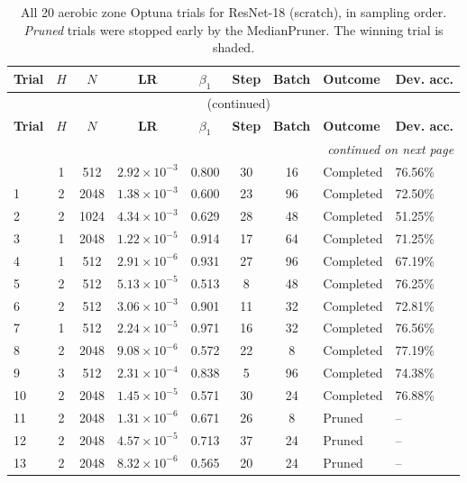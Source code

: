 {\footnotesize
\begin{longtable}{lccccccll}
\caption{All 20 aerobic zone Optuna trials for ResNet-18 (scratch), in sampling order. \emph{Pruned} trials were stopped early by the MedianPruner. The winning trial is shaded.}
\label{tab:trials_aerobic_resnet18_scratch} \\
\toprule
\textbf{Trial} & \textbf{$H$} & \textbf{$N$} & \textbf{LR} & \textbf{$\beta_1$} & \textbf{Step} & \textbf{Batch} & \textbf{Outcome} & \textbf{Dev. acc.} \\
\midrule
\endfirsthead
\multicolumn{9}{c}{\tablename\ \thetable{} (continued)} \\
\toprule
\textbf{Trial} & \textbf{$H$} & \textbf{$N$} & \textbf{LR} & \textbf{$\beta_1$} & \textbf{Step} & \textbf{Batch} & \textbf{Outcome} & \textbf{Dev. acc.} \\
\midrule
\endhead
\midrule
\multicolumn{9}{r}{\emph{continued on next page}} \\
\endfoot
\bottomrule
\endlastfoot
0 & 1 & 512 & $2.92\times10^{-3}$ & 0.800 & 30 & 16 & Completed & 76.56\% \\
1 & 2 & 2048 & $1.38\times10^{-3}$ & 0.600 & 23 & 96 & Completed & 72.50\% \\
2 & 2 & 1024 & $4.34\times10^{-3}$ & 0.629 & 28 & 48 & Completed & 51.25\% \\
3 & 1 & 2048 & $1.22\times10^{-5}$ & 0.914 & 17 & 64 & Completed & 71.25\% \\
4 & 1 & 512 & $2.91\times10^{-6}$ & 0.931 & 27 & 96 & Completed & 67.19\% \\
5 & 2 & 512 & $5.13\times10^{-5}$ & 0.513 & 8 & 48 & Completed & 76.25\% \\
6 & 2 & 512 & $3.06\times10^{-3}$ & 0.901 & 11 & 32 & Completed & 72.81\% \\
7 & 1 & 512 & $2.24\times10^{-5}$ & 0.971 & 16 & 32 & Completed & 76.56\% \\
8 & 2 & 2048 & $9.08\times10^{-6}$ & 0.572 & 22 & 8 & Completed & 77.19\% \\
9 & 3 & 512 & $2.31\times10^{-4}$ & 0.838 & 5 & 96 & Completed & 74.38\% \\
10 & 2 & 2048 & $1.45\times10^{-5}$ & 0.571 & 30 & 24 & Completed & 76.88\% \\
11 & 2 & 2048 & $1.31\times10^{-6}$ & 0.671 & 26 & 8 & Pruned & -- \\
12 & 2 & 2048 & $4.57\times10^{-5}$ & 0.713 & 37 & 24 & Pruned & -- \\
13 & 2 & 2048 & $8.32\times10^{-6}$ & 0.565 & 20 & 24 & Pruned & -- \\

\end{longtable}}
